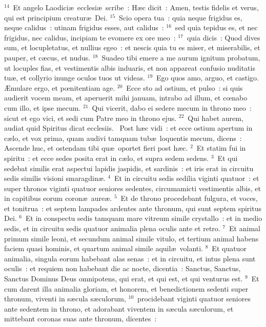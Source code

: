 ${}^{14}$~Et angelo Laodici\ae\ ecclesi\ae\ scribe~: H\ae c dicit~: Amen, testis fidelis et verus, qui est principium creatur\ae\ Dei.
${}^{15}$~Scio opera tua~: quia neque frigidus es, neque calidus~: utinam frigidus esses, aut calidus~:
${}^{16}$~sed quia tepidus es, et nec frigidus, nec calidus, incipiam te evomere ex ore meo~:
${}^{17}$~quia dicis~: Quod dives sum, et locupletatus, et nullius egeo~: et nescis quia tu es miser, et miserabilis, et pauper, et c\ae cus, et nudus.
${}^{18}$~Suadeo tibi emere a me aurum ignitum probatum, ut locuples fias, et vestimentis albis induaris, et non appareat confusio nuditatis tu\ae , et collyrio inunge oculos tuos ut videas.
${}^{19}$~Ego quos amo, arguo, et castigo. \AE mulare ergo, et pœnitentiam age.
${}^{20}$~Ecce sto ad ostium, et pulso~: si quis audierit vocem meam, et aperuerit mihi januam, intrabo ad illum, et cœnabo cum illo, et ipse mecum.
${}^{21}$~Qui vicerit, dabo ei sedere mecum in throno meo~: sicut et ego vici, et sedi cum Patre meo in throno ejus.
${}^{22}$~Qui habet aurem, audiat quid Spiritus dicat ecclesiis.
~Post h\ae c vidi~: et ecce ostium apertum in c\ae lo, et vox prima, quam audivi tamquam tub\ae\ loquentis mecum, dicens~: Ascende huc, et ostendam tibi qu\ae\ oportet fieri post h\ae c.
${}^{2}$~Et statim fui in spiritu~: et ecce sedes posita erat in c\ae lo, et supra sedem sedens.
${}^{3}$~Et qui sedebat similis erat aspectui lapidis jaspidis, et sardinis~: et iris erat in circuitu sedis similis visioni smaragdin\ae .
${}^{4}$~Et in circuitu sedis sedilia viginti quatuor~: et super thronos viginti quatuor seniores sedentes, circumamicti vestimentis albis, et in capitibus eorum coron\ae\ aure\ae .
${}^{5}$~Et de throno procedebant fulgura, et voces, et tonitrua~: et septem lampades ardentes ante thronum, qui sunt septem spiritus Dei.
${}^{6}$~Et in conspectu sedis tamquam mare vitreum simile crystallo~: et in medio sedis, et in circuitu sedis quatuor animalia plena oculis ante et retro.
${}^{7}$~Et animal primum simile leoni, et secundum animal simile vitulo, et tertium animal habens faciem quasi hominis, et quartum animal simile aquil\ae\ volanti.
${}^{8}$~Et quatuor animalia, singula eorum habebant alas senas~: et in circuitu, et intus plena sunt oculis~: et requiem non habebant die ac nocte, dicentia~: Sanctus, Sanctus, Sanctus Dominus Deus omnipotens, qui erat, et qui est, et qui venturus est.
${}^{9}$~Et cum darent illa animalia gloriam, et honorem, et benedictionem sedenti super thronum, viventi in s\ae cula s\ae culorum,
${}^{10}$~procidebant viginti quatuor seniores ante sedentem in throno, et adorabant viventem in s\ae cula s\ae culorum, et mittebant coronas suas ante thronum, dicentes~:
